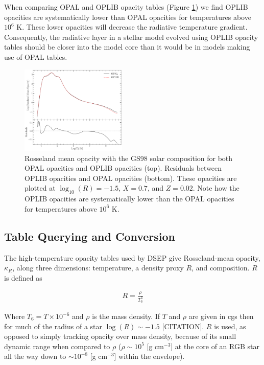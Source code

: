 When comparing OPAL and OPLIB opacity tables (Figure \ref{fig:opacComp}) we
find OPLIB opacities are systematically lower than OPAL opacities for
temperatures above $10^{6}$ K. These lower opacities will decrease the radiative
temperature gradient. Consequently, the radiative layer in a stellar model
evolved using OPLIB opacity tables should be closer into the model core than it
would be in models making use of OPAL tables.

\begin{figure}
	\centering
	\includegraphics[width=0.45\textwidth]{src/figures/OpacityComparision.pdf}
	\caption{Rosseland mean opacity with the GS98 solar composition for both
	OPAL opacities and OPLIB opacities (top). Residuals between OPLIB opacities
	and OPAL opacities (bottom). These opacities are plotted at $\log _{10}(R)
	= -1.5$, $X=0.7$, and $Z=0.02$. Note how the OPLIB opacities are
	systematically lower than the OPAL opacities for temperatures above $10^6$
	K.}
	\label{fig:opacComp}
\end{figure}

\subsection{Table Querying and Conversion}
The high-temperature opacity tables used by DSEP give Rosseland-mean opacity,
$\kappa_{R}$, along three dimensions: temperature, a density proxy $R$, and
composition. $R$ is defined as

\begin{align} \label{eqn:Req}
	R = \frac{\rho}{T_{6}^{3}}
\end{align}

Where $T_{6} = T\times10^{-6}$ and $\rho$ is the mass density. If $T$ and
$\rho$ are given in cgs then for much of the radius of a star $\log(R)\sim-1.5$
{\color{red}[CITATION]}.  $R$ is used, as opposed to simply tracking opacity
over mass density, because of its small dynamic range when compared to $\rho$ ($\rho\sim
10^{5}$ [g cm$^{-3}$] at the core of an RGB star all the way down to $\sim
10^{-8}$ [g cm$^{-3}$] within the envelope). 

